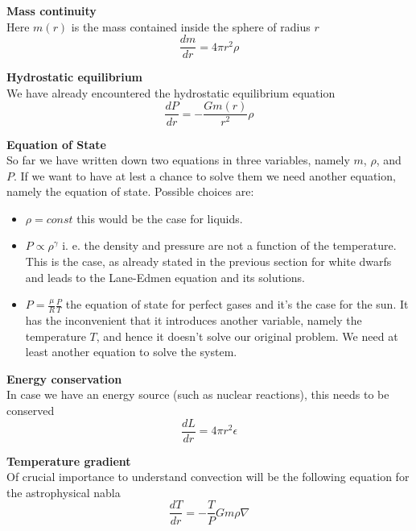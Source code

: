 \textbf{Mass continuity} \\
Here $m(r)$ is the mass contained inside the sphere of radius $r$
\begin{equation}\label{masscons}
	\frac{dm}{dr}=4 \pi r^2 \rho
\end{equation}

\textbf{Hydrostatic equilibrium} \\
We have already encountered the hydrostatic equilibrium equation
\begin{equation}\label{hydroeq}
	\frac{dP}{dr}= - \frac{G m(r)}{r^2} \rho
\end{equation}

\textbf{Equation of State} \\
So far we have written down two equations in three variables, namely $m$, $\rho$, and $P$. If we want to have at lest a chance to solve them we need another equation, namely the equation of state. Possible choices are:
\begin{itemize}
	\item $\rho=const$ this would be the case for liquids.
	\item $P\propto \rho^\gamma$ i. e. the density and pressure are not a function of the temperature. This is the case, as already stated in the previous section for white dwarfs and leads to the Lane-Edmen equation and its solutions.
	\item $P=\frac{\mu}{R}\frac{P}{T}$ the equation of state for perfect gases and it's the case for the sun. It has the inconvenient that it introduces another variable, namely the temperature $T$, and hence it doesn't solve our original problem. We need at least another equation to solve the system. 
\end{itemize}

\textbf{Energy conservation} \\
In case we have an energy source (such as nuclear reactions), this needs to be conserved
\begin{equation}\label{energycons}
	\frac{dL}{dr} = 4 \pi r^2 \epsilon
\end{equation}

\textbf{Temperature gradient} \\
Of crucial importance to understand convection will be the following equation for the astrophysical nabla
\begin{equation}\label{energytransfer}
\frac{d T}{d r} = - \frac{T }{P} G m \rho\nabla
\end{equation}


